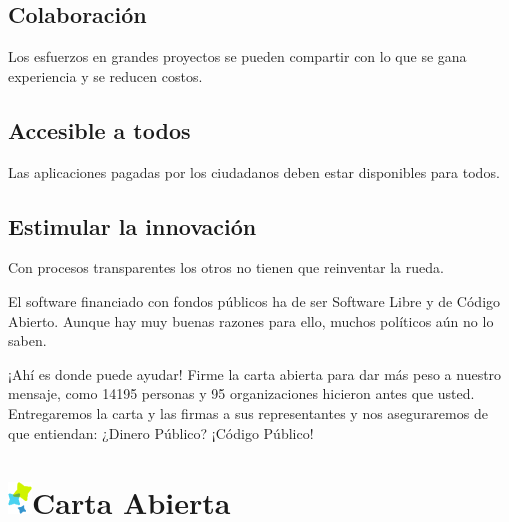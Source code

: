 \documentclass[10pt,foldmark,tumble]{leaflet}
\begin{document}
\subsection{Colaboración}

Los esfuerzos en grandes proyectos se pueden compartir con lo que se gana experiencia y se reducen costos.

\subsection{Accesible a todos}

Las aplicaciones pagadas por los ciudadanos deben estar disponibles para todos.

\subsection{Estimular la innovación}

Con procesos transparentes los otros no tienen que reinventar la rueda.

\vspace{1em}

El software financiado con fondos públicos ha de ser Software Libre y de Código Abierto. Aunque hay muy buenas razones para ello, muchos políticos aún no lo saben.

\vspace{2em}

\begin{mdframed}[style=MyFrame]
\end{mdframed}


\vspace{2em}

¡Ahí es donde puede ayudar! Firme la carta abierta para dar más peso a nuestro mensaje, como 14195 personas y 95 organizaciones hicieron antes que usted. Entregaremos la carta y las firmas a sus representantes y nos aseguraremos de que entiendan: ¿Dinero Público? ¡Código Público!



\section{\includegraphics{item.png}Carta Abierta}
\vspace{1em}
\end{document}
